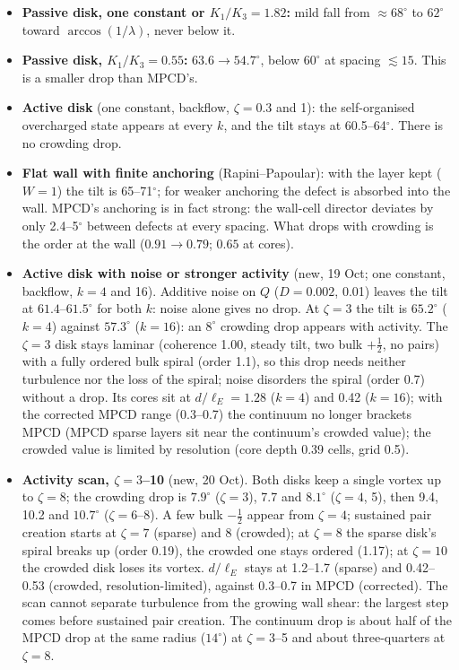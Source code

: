 \documentclass[11pt,a4paper]{article}
\newcommand{\half}{\tfrac12}
\begin{document}
\begin{itemize}
\item \textbf{Passive disk, one constant or $K_1/K_3=1.82$:} mild fall from $\approx68^\circ$ to $62^\circ$ toward $\arccos(1/\lambda)$, never below it.
\item \textbf{Passive disk, $K_1/K_3=0.55$:} $63.6\to54.7^\circ$, below $60^\circ$ at spacing $\lesssim15$. This is a smaller drop than MPCD's.
\item \textbf{Active disk} (one constant, backflow, $\zeta=0.3$ and 1): the self-organised overcharged state appears at every $k$, and the tilt stays at 60.5--64$^\circ$. There is no crowding drop.
\item \textbf{Flat wall with finite anchoring} (Rapini--Papoular): with the layer kept ($W=1$) the tilt is 65--71$^\circ$; for weaker anchoring the defect is absorbed into the wall. MPCD's anchoring is in fact strong: the wall-cell director deviates by only 2.4--5$^\circ$ between defects at every spacing. What drops with crowding is the order at the wall ($0.91\to0.79$; $0.65$ at cores).
\item \textbf{Active disk with noise or stronger activity} (new, 19 Oct; one constant, backflow, $k=4$ and 16). Additive noise on $Q$ ($D=0.002$, 0.01) leaves the tilt
at $61.4$--$61.5^\circ$ for both $k$: noise alone gives no drop. At $\zeta=3$ the tilt is $65.2^\circ$ ($k=4$) against $57.3^\circ$ ($k=16$): an $8^\circ$ crowding drop
appears with activity. The $\zeta=3$ disk stays laminar (coherence 1.00, steady tilt, two bulk $+\half$, no pairs) with a fully ordered bulk spiral (order 1.1), so this drop needs neither turbulence nor the loss of the spiral; noise disorders the spiral (order 0.7) without a drop. Its cores sit at $d/\ell_E=1.28$ ($k=4$) and 0.42 ($k=16$); with the corrected MPCD range (0.3--0.7) the continuum no longer brackets MPCD (MPCD sparse layers sit near the continuum's crowded value); the crowded value is limited by resolution (core depth 0.39 cells, grid 0.5).
\item \textbf{Activity scan, $\zeta=3$--10} (new, 20 Oct). Both disks keep a single vortex up to $\zeta=8$; the crowding drop is $7.9^\circ$ ($\zeta=3$), 7.7 and $8.1^\circ$ ($\zeta=4$, 5), then 9.4, 10.2 and $10.7^\circ$ ($\zeta=6$--8). A few bulk $-\half$ appear from $\zeta=4$; sustained pair creation starts at $\zeta=7$ (sparse) and 8 (crowded); at $\zeta=8$ the sparse disk's spiral breaks up (order 0.19), the crowded one stays ordered (1.17); at $\zeta=10$ the crowded disk loses its vortex. $d/\ell_E$ stays at 1.2--1.7 (sparse) and 0.42--0.53 (crowded, resolution-limited), against 0.3--0.7 in MPCD (corrected). The scan cannot separate turbulence from the growing wall shear: the largest step comes before sustained pair creation. The continuum drop is about half of the MPCD drop at the same radius ($14^\circ$) at $\zeta=3$--5 and about three-quarters at $\zeta=8$.

\end{itemize}
\end{document}
